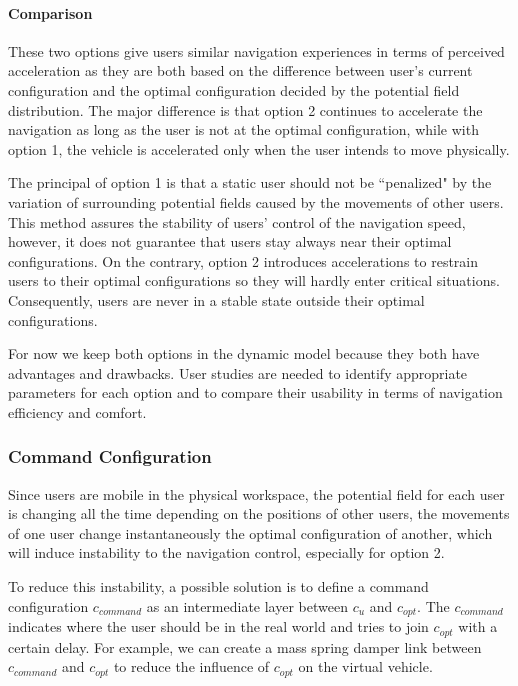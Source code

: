 \paragraph{Comparison}
These two options give users similar navigation experiences in terms of perceived acceleration as they are both based on the difference between user's current configuration and the optimal configuration decided by the potential field distribution. The major difference is that option 2 continues to accelerate the navigation as long as the user is not at the optimal configuration, while with option 1, the vehicle is accelerated only when the user intends to move physically.

The principal of option 1 is that a static user should not be ``penalized" by the variation of surrounding potential fields caused by the movements of other users. This method assures the stability of users' control of the navigation speed, however, it does not guarantee that users stay always near their optimal configurations. On the contrary, option 2 introduces accelerations to restrain users to their optimal configurations so they will hardly enter critical situations. Consequently, users are never in a stable state outside their optimal configurations.

For now we keep both options in the dynamic model because they both have advantages and drawbacks. User studies are needed to identify appropriate parameters for each option and to compare their usability in terms of navigation efficiency and comfort.

\subsubsection{Command Configuration}
Since users are mobile in the physical workspace, the potential field for each user is changing all the time depending on the positions of other users, the movements of one user change instantaneously the optimal configuration of another, which will induce instability to the navigation control, especially for option 2.

To reduce this instability, a possible solution is to define a command configuration $c_{command}$ as an intermediate layer between $c_{u}$ and $c_{opt}$. The $c_{command}$ indicates where the user should be in the real world and tries to join $c_{opt}$ with a certain delay. For example, we can create a mass spring damper link between $c_{command}$ and $c_{opt}$ to reduce the influence of $c_{opt}$ on the virtual vehicle.

